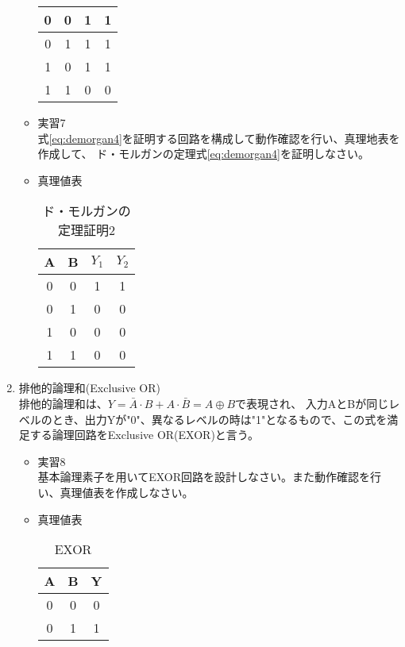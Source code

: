 \documentclass[dvipdfmx]{jsarticle}
\begin{document}
\begin{enumerate}
\begin{itemize}
\begin{table}[H]
\begin{tabular}{|c|c|c|c|}
										0 & 0 & 1 & 1 \\ \hline
										0 & 1 & 1 & 1\\ \hline
										1 & 0 & 1 & 1\\ \hline
										1 & 1 & 0 & 0\\ \hline
									\end{tabular}
								\end{table}
							\item 実習7 \\
								式\ref{eq:demorgan4}を証明する回路を構成して動作確認を行い、真理地表を作成して、
								ド・モルガンの定理式\ref{eq:demorgan4}を証明しなさい。
							\item 真理値表
								\begin{table}[H]
									\center
									\caption{ド・モルガンの定理証明2 \label{tb:demorgan2}}
									\begin{tabular}{|c|c|c|c|}
										\hline
										A & B & $Y_1$ &$Y_2$ \\ \hline
										0 & 0 & 1 & 1 \\ \hline
										0 & 1 & 0 & 0\\ \hline
										1 & 0 & 0 & 0\\ \hline
										1 & 1 & 0 & 0\\ \hline
									\end{tabular}
								\end{table}
						\end{itemize}
					\item 排他的論理和(Exclusive OR) \\
						排他的論理和は、$Y = \bar{A} \cdot B + A \cdot \bar{B} = A \oplus B$で表現され、
						入力AとBが同じレベルのとき、出力Yが"0"、異なるレベルの時は"1"となるもので、この式を満足する論理回路をExclusive OR(EXOR)と言う。
						\begin{itemize}
							\item 実習8\\
								基本論理素子を用いてEXOR回路を設計しなさい。また動作確認を行い、真理値表を作成しなさい。
							\item 真理値表
								\begin{table}[H]
									\center
									\caption{EXOR \label{tb:exor}}
									\begin{tabular}{|c|c|c|}
										\hline
										A & B & Y\\ \hline
										0 & 0 & 0\\ \hline
										0 & 1 & 1\\ \hline

\end{tabular}
\end{table}
\end{itemize}
\end{enumerate}
\end{document}
